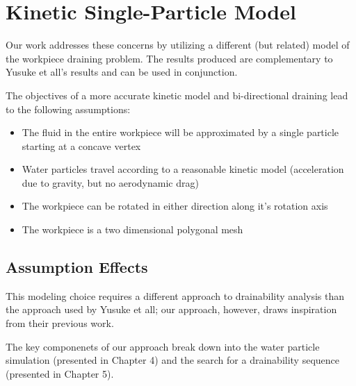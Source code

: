 

\section{Kinetic Single-Particle Model}

Our work addresses these concerns by utilizing a different (but related) model of the workpiece draining problem. The results produced are complementary to Yusuke et all's results and can be used in conjunction.

The objectives of a more accurate kinetic model and bi-directional draining lead to the following assumptions:

\begin{itemize}
	\item The fluid in the entire workpiece will be approximated by a single particle starting at a concave vertex
	\item Water particles travel according to a reasonable kinetic model (acceleration due to gravity, but no aerodynamic drag)
	\item The workpiece can be rotated in either direction along it's rotation axis
	\item The workpiece is a two dimensional polygonal mesh
\end{itemize}

	\subsection{Assumption Effects}

This modeling choice requires a different approach to drainability analysis than the approach used by Yusuke et all; our approach, however, draws inspiration from their previous work.

The key componenets of our approach break down into the water particle simulation (presented in Chapter 4) and the search for a drainability sequence (presented in Chapter 5).



